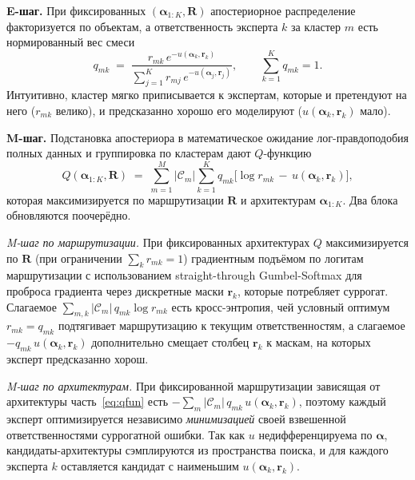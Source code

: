 \textbf{E-шаг.} При фиксированных $(\boldsymbol{\alpha}_{1:K}, \mathbf{R})$
апостериорное распределение факторизуется по объектам, а ответственность
эксперта $k$ за кластер $m$ есть нормированный вес смеси
\begin{equation}
\label{eq:estep}
q_{mk} \;=\; \frac{r_{mk}\, e^{-u(\boldsymbol{\alpha}_k, \mathbf{r}_k)}}
{\sum_{j=1}^{K} r_{mj}\, e^{-u(\boldsymbol{\alpha}_j, \mathbf{r}_j)}},
\qquad \sum_{k=1}^{K} q_{mk} = 1.
\end{equation}
Интуитивно, кластер мягко приписывается к экспертам, которые и
претендуют на него ($r_{mk}$ велико), и предсказанно хорошо его
моделируют ($u(\boldsymbol{\alpha}_k, \mathbf{r}_k)$ мало).

\textbf{M-шаг.} Подстановка апостериора в математическое ожидание
лог-правдоподобия полных данных и группировка по кластерам дают
$Q$-функцию
\begin{equation}
\label{eq:qfun}
Q(\boldsymbol{\alpha}_{1:K}, \mathbf{R})
\;=\; \sum_{m=1}^{M} |\mathcal{C}_m| \sum_{k=1}^{K} q_{mk}
\bigl[\log r_{mk} \,-\, u(\boldsymbol{\alpha}_k, \mathbf{r}_k)\bigr],
\end{equation}
которая максимизируется по маршрутизации $\mathbf{R}$ и архитектурам
$\boldsymbol{\alpha}_{1:K}$. Два блока обновляются поочерёдно.

\emph{M-шаг по маршрутизации.} При фиксированных архитектурах $Q$
максимизируется по $\mathbf{R}$ (при ограничении
$\sum_k r_{mk} = 1$) градиентным подъёмом по логитам маршрутизации с
использованием straight-through Gumbel-Softmax для проброса градиента
через дискретные маски $\mathbf{r}_k$, которые потребляет суррогат.
Слагаемое $\sum_{m,k} |\mathcal{C}_m|\, q_{mk}\log r_{mk}$ есть
кросс-энтропия, чей условный оптимум $r_{mk} = q_{mk}$ подтягивает
маршрутизацию к текущим ответственностям, а слагаемое
$-q_{mk}\,u(\boldsymbol{\alpha}_k, \mathbf{r}_k)$ дополнительно смещает
столбец $\mathbf{r}_k$ к маскам, на которых эксперт предсказанно хорош.

\emph{M-шаг по архитектурам.} При фиксированной маршрутизации
зависящая от архитектуры часть~\eqref{eq:qfun} есть
$-\sum_{m} |\mathcal{C}_m|\, q_{mk}\, u(\boldsymbol{\alpha}_k, \mathbf{r}_k)$,
поэтому каждый эксперт оптимизируется независимо \emph{минимизацией}
своей взвешенной ответственностями суррогатной ошибки. Так как $u$
недифференцируема по $\boldsymbol{\alpha}$, кандидаты-архитектуры
сэмплируются из пространства поиска, и для каждого эксперта $k$
оставляется кандидат с наименьшим $u(\boldsymbol{\alpha}_k, \mathbf{r}_k)$.

